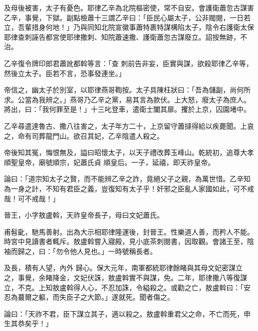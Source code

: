 \begin{pinyinscope}
 及母後被害，太子有憂色。耶律乙辛為北院樞密使，常不自安。會護衛蕭忽古謀害乙辛，事覺，下獄。副點檢蕭十三謂乙辛曰：「臣民心屬太子，公非閥閱，一日若立，吾輩措身何地！」乃與同知北院宣徽事蕭特裹特謀構陷太子，陰令右護衛太保耶律查刺誣告都宮使耶律撒刺、知院蕭速撒、護衛蕭忽古謀廢立。詔按無跡，不治。



 乙辛復令牌印郎君蕭訛都斡等言：「查
 刺前告非妄，臣實與謀，欲殺耶律乙辛等，然後立太子。臣若不言，恐事發連坐。」



 帝信之，幽太子於別室，以耶律燕哥鞫按。太子具陳枉狀曰：「吾為儲副，尚何所求。公當為我辨之。」燕哥乃乙辛之黨，易其言為款伏。上大怒，廢太子為庶人。將出，曰：「我何罪至是！」十三叱登車，遣衛士闔其扉。攫於上京，囚園堵中。



 乙辛尋遣達魯古、撒八往害之，太子年方二十，上京留守蕭撻得給以疾薨聞。上哀之，命有司葬龍門山。欲召其妃，乙辛陰遣人殺之。



 帝後知其冤，悔恨無及，謚曰昭懷太子，以天子禮改葬玉峰山。乾統初，追尊大孝順聖皇帝，廟號順宗，妃蕭氏貞
 順皇后。一子，延禧，即天祚皇帝。



 論曰：「道宗知太子之賢，而不能辨乙辛之詐，竟絕父子之親，為萬世惜。乙辛知為一身之計，不知有君臣之義，豈復知有太子乎！奸邪之臣亂人家國如此，可不戒哉！可不戒哉！」



 晉王，小字敖盧斡，天祚皇帝長子，母曰文妃蕭氏。



 甫髫齔，馳馬善射。出為大示相耶律隆運後，封晉王。性樂道人善，而矜人不能。時宮中見讀書者輒斥。敖盧斡嘗入寢殿，見小底茶刺閱書，因取觀。會諸王至，陰袖而歸之，曰：「勿令他人見也。」一時號稱長者。



 及長，積有人望，內外
 歸心。保大元年，南軍都統耶律餘睹與其母文妃密謀立之，事覺，余睹降金，文妃伏誅，敖盧斡實不與謀，免。二年，耶律撒八等復謀立，不克。上知敖盧斡得人心，不忍加誅，令縊殺之。或勸之亡，敖盧斡曰：「安忍為蕞爾之軀，而失臣子之大節。」遂就死。聞者傷之。



 論曰：「天祚不君，臣下謀立其子，適以殺之。敖盧斡重君父之命，不亡而死，申生其恭矣乎！」



\end{pinyinscope}